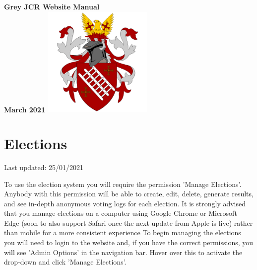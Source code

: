 \documentclass{article}
\begin{document}
\begin{titlepage}
    \begin{center}
        \vspace*{1cm}
        \Huge
        \textbf{Grey JCR Website Manual}
        \\
        \vspace{1cm}
        \LARGE
        \textbf{March 2021}
        \vfill
        \includegraphics[width=0.4\textwidth]{logo512.png}
    \end{center}
\end{titlepage}

\newpage
\tableofcontents
\newpage

\section{Elections}
Last updated: 25/01/2021

To use the election system you will require the permission 'Manage Elections'. Anybody with this permission will be able to create, edit, delete, generate results, and see in-depth anonymous voting logs for each election. It is strongly advised that you manage elections on a computer using Google Chrome or Microsoft Edge (soon to also support Safari once the next update from Apple is live) rather than mobile for a more consistent experience To begin managing the elections you will need to login to the website and, if you have the correct permissions, you will see 'Admin Options' in the navigation bar. Hover over this to activate the drop-down and click 'Manage Elections'.
\end{document}
